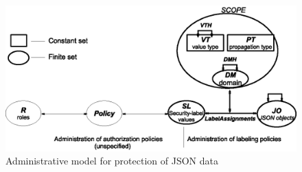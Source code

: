  
 	\begin{figure} [t]
 		\centering
 		\includegraphics[width=.9\textwidth]{administrative-model}
 		\caption{Administrative model for protection of JSON data}
 		\label{fig:administrative-model}
 	\end{figure}
 